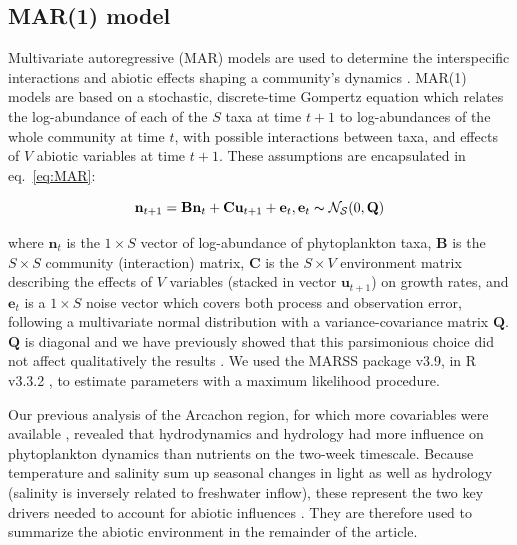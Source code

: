 \documentclass[10pt]{article}
\begin{document}
\subsection*{MAR(1) model}

Multivariate autoregressive (MAR) models are used to determine the
interspecific interactions and abiotic effects shaping a community's
dynamics \citep{ives_estimating_2003}. MAR(1) models are based on
a stochastic, discrete-time Gompertz equation which relates the log-abundance
of each of the $S$ taxa at time $t+1$ to log-abundances of the whole
community at time $t$, with possible interactions between taxa, and
effects of $V$ abiotic variables at time $t+1$. These assumptions
are encapsulated in eq.~\ref{eq:MAR}:

\begin{equation}
\mathbf{n}_{t+1}=\mathbf{B}\mathbf{n}_{t}+\textbf{C}\textbf{u}_{t+1}+\mathbf{e}_{t},\mathbf{e}_{t}\thicksim\mathcal{{N_{S}}}(0,\mathbf{Q})\label{eq:MAR}
\end{equation}

where $\mathbf{n}_{\ensuremath{t}}$ is the $1\times S$ vector of
log-abundance of phytoplankton taxa, $\mathbf{B}$ is the $S\times S$
community (interaction) matrix, $\mathbf{C}$ is the $S\times V$
environment matrix describing the effects of $V$ variables (stacked
in vector $\mathbf{u}_{t+1}$) on growth
rates, and $\mathbf{e}_{t}$ is a $1\times S$ noise vector which
covers both process and observation error, following a multivariate
normal distribution with a variance-covariance matrix $\mathbf{Q}$.
$\mathbf{Q}$ is diagonal and we have previously showed that this
parsimonious choice did not affect qualitatively the results \citep{barraquand_coastal_2018}. We used the MARSS package \citep{holmes_analysis_2014} v3.9, in R
v3.3.2 \citep{venables_r_2013}, to estimate parameters with a maximum
likelihood procedure.

Our previous analysis of the Arcachon region, for which more covariables were available \citep{barraquand_coastal_2018},
revealed that hydrodynamics and hydrology had more influence on phytoplankton dynamics than nutrients on the two-week timescale.
Because temperature and salinity sum up seasonal changes in light as well as hydrology (salinity is inversely related to freshwater
inflow), these represent the two key drivers needed to account for abiotic influences \citep{scheef_inferring_2013}.
They are therefore used to summarize the abiotic environment in the remainder of the article. 
\end{document}
